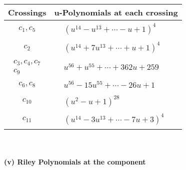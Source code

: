 \documentclass[1p]{elsarticle_modified}
\theoremstyle{definition}
\begin{document}
\begin{tabular}{m{50pt}|m{274pt}}
Crossings & \hspace{64pt}u-Polynomials at each crossing \\
\hline $$\begin{aligned}c_{1},c_{5}\end{aligned}$$&$\begin{aligned}
&(u^{14}- u^{13}+\cdots- u+1)^{4}
\end{aligned}$\\
\hline $$\begin{aligned}c_{2}\end{aligned}$$&$\begin{aligned}
&(u^{14}+7 u^{13}+\cdots+u+1)^{4}
\end{aligned}$\\
\hline $$\begin{aligned}c_{3},c_{4},c_{7}\\c_{9}\end{aligned}$$&$\begin{aligned}
&u^{56}+u^{55}+\cdots+362 u+259
\end{aligned}$\\
\hline $$\begin{aligned}c_{6},c_{8}\end{aligned}$$&$\begin{aligned}
&u^{56}-15 u^{55}+\cdots-26 u+1
\end{aligned}$\\
\hline $$\begin{aligned}c_{10}\end{aligned}$$&$\begin{aligned}
&(u^2- u+1)^{28}
\end{aligned}$\\
\hline $$\begin{aligned}c_{11}\end{aligned}$$&$\begin{aligned}
&(u^{14}-3 u^{13}+\cdots-7 u+3)^{4}
\end{aligned}$\\
\hline
\end{tabular}\\~\\
\newpage\renewcommand{\arraystretch}{1}
\flushleft \textbf{(v) Riley Polynomials at the component}\newline \\
\end{document}
